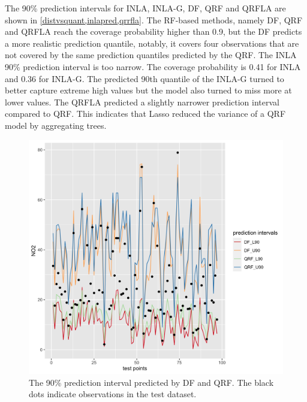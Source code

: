 \documentclass{article}
\begin{document}
The 90\% prediction intervals for INLA, INLA-G, DF, QRF and QRFLA are shown in \cref{distvsquant,inlapred,qrrfla}. The RF-based methods, namely DF, QRF and QRFLA reach the coverage probability higher than 0.9, but the DF predicts a more realistic prediction quantile, notably, it covers four observations that are not covered by the same prediction quantiles predicted by the QRF. The INLA 90\% prediction interval is too narrow. The coverage probability is 0.41 for INLA and 0.36 for INLA-G. The predicted 90th quantile of the INLA-G turned to better capture extreme high values but the model also turned to miss more at lower values. The QRFLA predicted a slightly narrower prediction interval compared to QRF. This indicates that Lasso reduced the variance of a QRF model by aggregating trees.  

\label{sec:predinterval}
\begin{figure}
\centering
\includegraphics[scale = 0.2]{fig/qrf_df.png}
\caption{The 90\% prediction interval predicted by DF and QRF. The black dots indicate observations in the test dataset.}
\label{distvsquant}
\end{figure}
\end{document}
